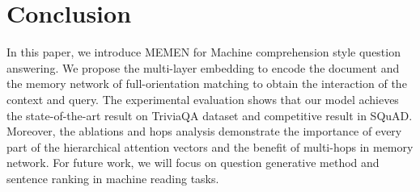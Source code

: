 \documentclass[letterpaper]{article}
\begin{document}
\section{Conclusion}
In this paper, we introduce MEMEN for Machine comprehension style question answering. We propose the multi-layer embedding to encode the document and the memory network of full-orientation matching to obtain the interaction of the context and query.  The experimental evaluation shows that our model achieves the state-of-the-art result on TriviaQA dataset and competitive result in SQuAD. Moreover, the ablations and hops analysis demonstrate the importance of every part of the hierarchical attention vectors and the benefit of multi-hops in memory network. For future work, we will focus on question generative method and sentence ranking in machine reading tasks.





\end{document}
